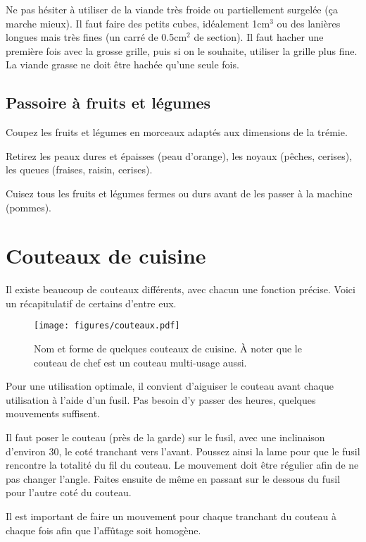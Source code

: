 \documentclass[a4paper,twoside,openright]{report}
\begin{document}
Ne pas hésiter à utiliser de la viande très froide ou partiellement surgelée (ça marche mieux). Il faut faire des petits cubes, 
idéalement 1cm$^3$ ou des lanières longues mais très fines (un carré de 0.5cm$^2$ de section).
Il faut hacher une première fois avec la grosse grille, puis si on le souhaite, utiliser la grille plus fine. La viande grasse 
ne doit être hachée qu'une seule fois.

\subsection{Passoire à fruits et légumes}
Coupez les fruits et légumes en morceaux adaptés aux dimensions de la trémie. 

Retirez les peaux dures et épaisses (peau d'orange), les noyaux (pêches, cerises), les queues (fraises, raisin, cerises).

Cuisez tous les fruits et légumes fermes ou durs avant de les passer à la machine (pommes).

\section{Couteaux de cuisine}
Il existe beaucoup de couteaux différents, avec chacun une fonction précise. Voici un récapitulatif de certains d'entre eux.

\begin{figure}[htb]
\centering
\texttt{[image: figures/couteaux.pdf]}
\caption{Nom et forme de quelques couteaux de cuisine. À noter que le couteau de chef est un couteau multi-usage aussi.}
\end{figure}

\begin{remarque}
Pour une utilisation optimale, il convient d'aiguiser le couteau avant chaque utilisation à l'aide d'un fusil. Pas besoin d'y passer des heures, quelques mouvements suffisent.

Il faut poser le couteau (près de la garde) sur le fusil, avec une inclinaison d'environ 30\degre, le coté tranchant vers l'avant. Poussez ainsi la lame pour que le fusil rencontre la totalité du fil du couteau. Le mouvement doit être régulier afin de ne pas changer l'angle. Faites ensuite de même en passant sur le dessous du fusil pour l'autre coté du couteau.

Il est important de faire un mouvement pour chaque tranchant du couteau à chaque fois afin que l'affûtage soit homogène.
\end{remarque}
\end{document}
